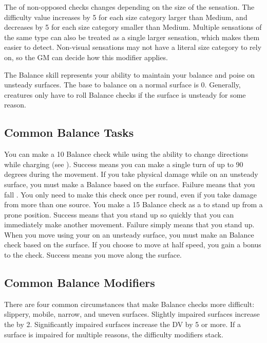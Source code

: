         The  of non-opposed checks changes depending on the size of the sensation.
        The difficulty value increases by 5 for each size category larger than Medium, and decreases by 5 for each size category smaller than Medium.
        Multiple sensations of the same type can also be treated as a single larger sensation, which makes them easier to detect.
        Non-visual sensations may not have a literal size category to rely on, so the GM can decide how this modifier applies.

\newpage
{}
    The Balance skill represents your ability to maintain your balance and poise on unsteady surfaces.
    The base  to balance on a normal surface is 0.
    Generally, creatures only have to roll Balance checks if the surface is unsteady for some reason.

    \subsection{Common Balance Tasks}
        \label{Agile Charge} You can make a  10 Balance check while using the  ability to change directions while charging (see ).
        Success means you can make a single turn of up to 90 degrees during the movement.
         If you take physical damage while on an unsteady surface, you must make a Balance  based on the surface.
        Failure means that you fall \prone.
        You only need to make this check once per round, even if you take damage from more than one source.
        \label{Rapid Stand} You make a  15 Balance check as a  to stand up from a prone position.
        Success means that you stand up so quickly that you can immediately make another movement.
        Failure simply means that you stand up.
         When you move using your  on an unsteady surface, you must make an Balance check based on the surface.
        If you choose to move at half speed, you gain a  bonus to the check.
        Success means you move along the surface.

    \subsection{Common Balance Modifiers}
        There are four common circumstances that make Balance checks more difficult: slippery, mobile, narrow, and uneven surfaces.
        Slightly impaired surfaces increase the  by 2.
        Significantly impaired surfaces increase the DV by 5 or more.
        If a surface is impaired for multiple reasons, the difficulty modifiers stack.

